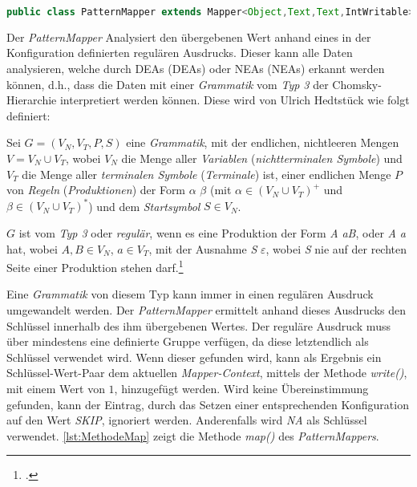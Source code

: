 \begin{lstlisting}[language=Java,caption=Deklaration \textit{PatternMapper} mit Generics,label=lst:DefinitionPatternMapper]
public class PatternMapper extends Mapper<Object,Text,Text,IntWritable>
\end{lstlisting}

Der \textit{PatternMapper} Analysiert den übergebenen Wert anhand eines in der Konfiguration definierten regulären Ausdrucks. Dieser kann alle Daten analysieren, welche durch \aclp{DEA} ({\color{LinkColor}\acsp{DEA}}) oder \aclp{NEA} ({\color{LinkColor}\acsp{NEA}}) erkannt werden können, d.h., dass die Daten mit einer \textit{Grammatik} vom \textit{Typ 3} der Chomsky-Hierarchie interpretiert werden können. Diese wird von Ulrich Hedtstück wie folgt definiert:

Sei $G = (V_N, V_T, P, S)$ eine \textit{Grammatik}, mit der endlichen, nichtleeren Mengen $V = V_N \cup V_T$, wobei $V_N$ die Menge aller \textit{Variablen} (\textit{nichtterminalen Symbole}) und $V_T$ die Menge aller \textit{terminalen Symbole} (\textit{Terminale}) ist, einer endlichen Menge $P$ von \textit{Regeln} (\textit{Produktionen}) der Form $\alpha$ \textrightarrow $\beta$ (mit $\alpha \in (V_N \cup V_T)^+$ und $\beta \in (V_N \cup V_T)^*$) und dem \textit{Startsymbol} $S \in V_N$. 

$G$ ist vom \textit{Typ 3} oder \textit{regulär}, wenn es eine Produktion der Form \textit{A} \textrightarrow \textit{aB}, oder \textit{A} \textrightarrow \textit{a} hat, wobei $A, B \in V_N$, $a \in V_T$, mit der Ausnahme \textit{S} \textrightarrow $\varepsilon$, wobei \textit{S} nie auf der rechten Seite einer Produktion stehen darf.\footcite[Vgl.][S. 25 u. 32]{Hedtstueck.2012}

Eine \textit{Grammatik} von diesem Typ kann immer in einen regulären Ausdruck umgewandelt werden. Der \textit{PatternMapper} ermittelt anhand dieses Ausdrucks den Schlüssel innerhalb des ihm übergebenen Wertes. Der reguläre Ausdruck muss über mindestens eine definierte Gruppe verfügen, da diese letztendlich als Schlüssel verwendet wird. Wenn dieser gefunden wird, kann als Ergebnis ein Schlüssel-Wert-Paar dem aktuellen \textit{Mapper-Context}, mittels der Methode \textit{write()}, mit einem Wert von $1$, hinzugefügt werden. Wird keine Übereinstimmung gefunden, kann der Eintrag, durch das Setzen einer entsprechenden Konfiguration auf den Wert \textit{SKIP}, ignoriert werden. Anderenfalls wird \textit{NA} als Schlüssel verwendet. \autoref{lst:MethodeMap} zeigt die Methode \textit{map()} des \textit{PatternMappers}. \\

